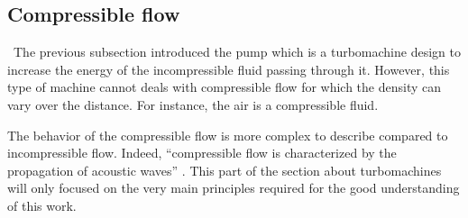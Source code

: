 


\subsection{Compressible flow}
\quad\ The previous subsection introduced the pump which is a turbomachine design to increase the energy of the incompressible fluid passing through it. However, this type of machine cannot deals with compressible flow for which the density can vary over the distance. For instance, the air is a compressible fluid.

The behavior of the compressible flow is more complex to describe compared to incompressible flow. Indeed, “compressible flow is characterized by the propagation of acoustic waves” \cite{Hillewaert2019}.   This part of the section about turbomachines will only focused on the very main principles required for the good understanding of this work.


